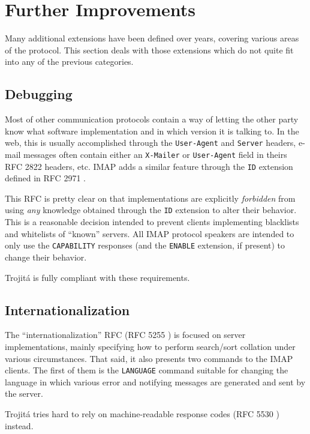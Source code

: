 \documentclass[trojita]{subfiles}
\begin{document}
\section{Further Improvements}

Many additional extensions have been defined over years, covering various areas of the protocol.  This section deals
with those extensions which do not quite fit into any of the previous categories.

\subsection{Debugging}

Most of other communication protocols contain a way of letting the other party know what software implementation and in
which version it is talking to.  In the web, this is usually accomplished through the {\tt User-Agent} and {\tt Server}
headers, e-mail messages often contain either an {\tt X-Mailer} or {\tt User-Agent} field in theirs RFC 2822 headers,
etc.  IMAP adds a similar feature through the {\tt ID} extension defined in RFC 2971 \cite{rfc2971}.

This RFC is pretty clear on that implementations are explicitly {\em forbidden} from using {\em any} knowledge obtained
through the {\tt ID} extension to alter their behavior.  This is a reasonable decision intended to prevent clients
implementing blacklists and whitelists of ``known'' servers.  All IMAP protocol speakers are intended to only use the
{\tt CAPABILITY} responses (and the {\tt ENABLE} extension, if present) to change their behavior.

\begin{trojitabehavior}
Trojitá is fully compliant with these requirements.
\end{trojitabehavior}

\subsection{Internationalization}

The ``internationalization'' RFC (RFC 5255 \cite{rfc5255}) is focused on server implementations, mainly specifying how
to perform search/sort collation under various circumstances.  That said, it also presents two commands to the IMAP
clients.  The first of them is the {\tt LANGUAGE} command suitable for changing the language in which various error and
notifying messages are generated and sent by the server.

\begin{trojitabehavior}
Trojitá tries hard to rely on machine-readable response codes (RFC 5530 \cite{rfc5530}) instead.
\end{trojitabehavior}
\end{document}

